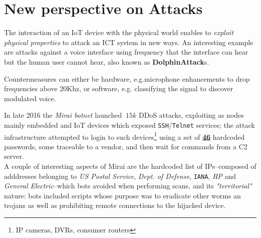 \section{New perspective on Attacks}

The interaction of an IoT device with the physical world enables to
\textit{exploit physical properties} to attack an ICT system in new ways.
An interesting example are attacks against a voice interface using frequency that the interface can hear but the human user cannot hear, also known as \textbf{DolphinAttack}s.


Countermeasures can either be hardware, e.g.microphone enhancements to drop frequencies above 20Khz, or software, e.g. classifying the signal to discover modulated voice.

In late 2016 the \textit{Mirai botnet} launched $~15k$ DDoS attacks, exploiting as nodes mainly embedded and IoT devices which exposed \texttt{SSH}/\texttt{Telnet} services;
the attack infrastructure attempted to login to such devices\footnote{IP cameras, DVRs, consumer routers} using a set of \underline{\textbf{46}} hardcoded passwords, some traceable to a vendor,
and then wait for commands from a C2 server.\\
A couple of interesting aspects of Mirai are the hardcoded list of IPs{--}composed of adddresses belonging to \textit{US Postal Service}, \textit{Dept. of Defense}, \texttt{IANA}, \textit{HP} and \textit{General Electric}{--}which bots avoided when performing scans,
and its \textit{"territorial"} nature:
bots included scripts whose purpose was to eradicate other worms an trojans as well as prohibiting remote connections to the hijacked device.
\nl

